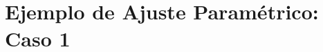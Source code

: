 \graphicspath{{anexos/AnexoE-Ejemplo-Ajuste-Parametrico/recursos/}}

\section{Ejemplo de Ajuste Paramétrico: Caso 1} \label{Anexo:ejemplo-ajuste-parametrico}
